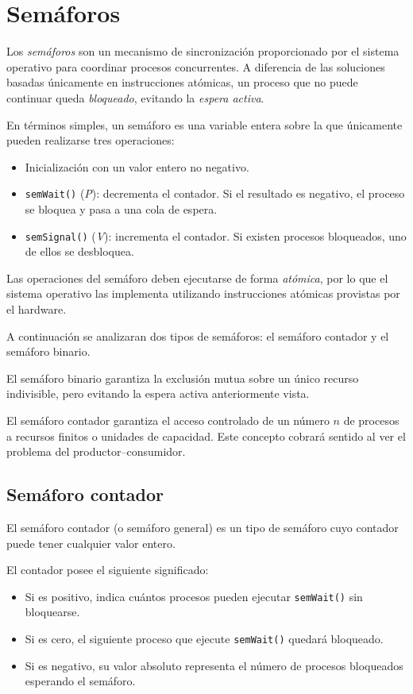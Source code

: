 \section{Semáforos}

Los \textit{semáforos} son un mecanismo de sincronización proporcionado por el sistema operativo para coordinar procesos concurrentes. A diferencia de las soluciones basadas únicamente en instrucciones atómicas, un proceso que no puede continuar queda \textit{bloqueado}, evitando la \textit{espera activa}.

En términos simples, un semáforo es una variable entera sobre la que únicamente pueden realizarse tres operaciones:
\begin{itemize}
  \item Inicialización con un valor entero no negativo.
  \item \texttt{semWait()} (\textit{P}): decrementa el contador. Si el resultado es negativo, el proceso se bloquea y pasa a una cola de espera.
  \item \texttt{semSignal()} (\textit{V}): incrementa el contador. Si existen procesos bloqueados, uno de ellos se desbloquea.
\end{itemize}

Las operaciones del semáforo deben ejecutarse de forma \textit{atómica}, por lo que el sistema operativo las implementa utilizando instrucciones atómicas provistas por el hardware.

A continuación se analizaran dos tipos de semáforos: el semáforo contador y el semáforo binario. 

El semáforo binario garantiza la exclusión mutua sobre un único recurso indivisible, pero evitando la espera activa anteriormente vista. 

El semáforo contador garantiza el acceso controlado de un número \(n\) de procesos a recursos finitos o unidades de capacidad. Este concepto cobrará sentido al ver el problema del productor--consumidor.

\subsection{Semáforo contador}

El semáforo contador (o semáforo general) es un tipo de semáforo cuyo contador puede tener cualquier valor entero. 

El contador posee el siguiente significado:
\begin{itemize}
  \item Si es positivo, indica cuántos procesos pueden ejecutar \texttt{semWait()} sin bloquearse.
  \item Si es cero, el siguiente proceso que ejecute \texttt{semWait()} quedará bloqueado.
  \item Si es negativo, su valor absoluto representa el número de procesos bloqueados esperando el semáforo.
\end{itemize}


